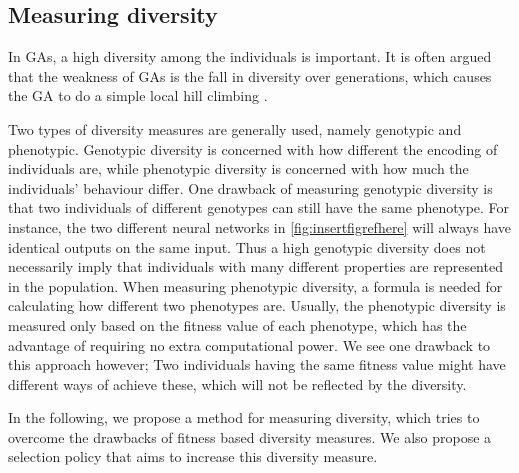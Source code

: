 \subsection{Measuring diversity}
In GAs, a high diversity among the individuals is important. It is often argued that the weakness of GAs is the fall in diversity over generations, which causes the GA to do a simple local hill climbing \citpls{}.

Two types of diversity measures are generally used, namely genotypic and phenotypic\cite{Nguyen:2006:ASPGP}.
Genotypic diversity is concerned with how different the encoding of individuals are, while phenotypic diversity is concerned with how much the individuals' behaviour differ.
One drawback of measuring genotypic diversity is that two individuals of different genotypes can still have the same phenotype.
For instance, the two different neural networks in \cref{fig:insertfigrefhere} will always have identical outputs on the same input.
Thus a high genotypic diversity does not necessarily imply that individuals with many different properties are represented in the population.
%
%
When measuring phenotypic diversity, a formula is needed for calculating how different two phenotypes are.
Usually, the phenotypic diversity is measured only based on the fitness value of each phenotype\cite{Nguyen:2006:ASPGP}, which has the advantage of requiring no extra computational power. 
We see one drawback to this approach however; Two individuals having the same fitness value might have different ways of achieve these, which will not be reflected by the diversity. 

In the following, we propose a method for measuring diversity, which tries to overcome the drawbacks of fitness based diversity measures.
We also propose a selection policy that aims to increase this diversity measure.
